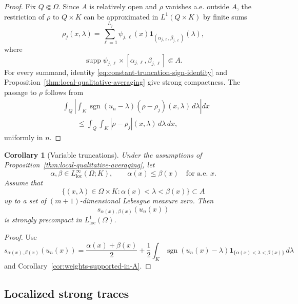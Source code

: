 \documentclass[11pt]{amsart}
\numberwithin{equation}{section}
\theoremstyle{plain}
\newtheorem{corollary}[theorem]{Corollary}
\theoremstyle{definition}
\theoremstyle{remark}
\begin{document}
\begin{proof}
Fix \(Q\Subset\Omega\).  Since \(A\) is relatively open and \(\rho\) vanishes
a.e. outside \(A\), the restriction of \(\rho\) to \(Q\times K\) can be
approximated in \(L^1(Q\times K)\) by finite sums
\[
    \rho_j(x,\lambda)
    =
    \sum_{\ell=1}^{L_j}
        \psi_{j,\ell}(x)
        \mathbf 1_{(\alpha_{j,\ell},\beta_{j,\ell})}(\lambda),
\]
where
\[
    \operatorname{supp}\psi_{j,\ell}
    \times
    [\alpha_{j,\ell},\beta_{j,\ell}]
    \Subset A.
\]
For every summand, identity
\eqref{eq:constant-truncation-sign-identity} and
Proposition~\ref{thm:local-qualitative-averaging} give strong compactness.
The passage to \(\rho\) follows from
\[
\begin{aligned}
&\int_Q
 \left|
 \int_K
     \operatorname{sgn}(u_n-\lambda)
     (\rho-\rho_j)(x,\lambda)\,d\lambda
 \right|dx
\\
&\qquad\le
 \int_Q\int_K
     |\rho-\rho_j|(x,\lambda)\,d\lambda\,dx,
\end{aligned}
\]
uniformly in \(n\).
\end{proof}

\begin{corollary}[Variable truncations]
\label{cor:variable-truncations}
Under the assumptions of
Proposition~\ref{thm:local-qualitative-averaging}, let
\[
    \alpha,\beta\in L^\infty_{\mathrm{loc}}(\Omega;K),
    \qquad
    \alpha(x)\le\beta(x)
    \quad\text{for a.e. }x.
\]
Assume that
\[
    \bigl\{
        (x,\lambda)\in\Omega\times K:
        \alpha(x)<\lambda<\beta(x)
    \bigr\}
    \subset A
\]
up to a set of \((m+1)\)-dimensional Lebesgue measure zero.  Then
\[
    s_{\alpha(x),\beta(x)}(u_n(x))
\]
is strongly precompact in \(L^1_{\mathrm{loc}}(\Omega)\).
\end{corollary}

\begin{proof}
Use
\begin{equation}
\label{eq:variable-truncation-identity}
    s_{\alpha(x),\beta(x)}(u_n(x))
    =
    \frac{\alpha(x)+\beta(x)}2
    +
    \frac12
    \int_K
        \operatorname{sgn}(u_n(x)-\lambda)
        \mathbf 1_{\{\alpha(x)<\lambda<\beta(x)\}}
        \,d\lambda
\end{equation}
and Corollary~\ref{cor:weights-supported-in-A}.
\end{proof}

\subsection{Localized strong traces}
\label{subsec:localized-panov-traces}
\end{document}
